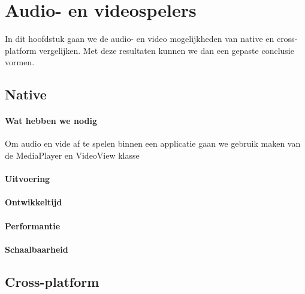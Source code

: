 
\chapter{Audio- en videospelers}%
\label{ch:audioenvideo}

In dit hoofdstuk gaan we de audio- en video mogelijkheden van native en cross-platform vergelijken. 
Met deze resultaten kunnen we dan een gepaste conclusie vormen.

\section{Native}
\subsubsection{Wat hebben we nodig}
Om audio en vide af te spelen binnen een applicatie gaan we gebruik maken van de MediaPlayer en 
VideoView klasse

\subsubsection{Uitvoering}



\subsubsection{Ontwikkeltijd}



\subsubsection{Performantie}



\subsubsection{Schaalbaarheid}




\section{Cross-platform}
